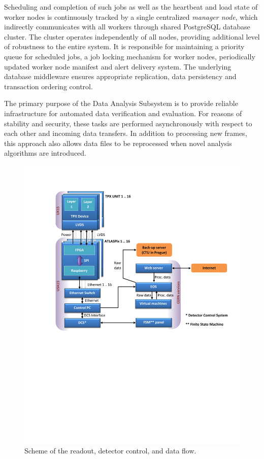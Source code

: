 \documentclass[conference]{IEEEtran}
\begin{document}
Scheduling and completion of such jobs as well as the heartbeat and load state of worker nodes is continuously tracked by a single centralized \textit{manager node}, which indirectly communicates with all workers through shared PostgreSQL database cluster. The cluster operates independently of all nodes, providing additional level of robustness to the entire system. It is responsible for maintaining a priority queue for scheduled jobs, a job locking mechanism for worker nodes, periodically updated worker node manifest and alert delivery system. The underlying database middleware ensures appropriate replication, data persistency and transaction ordering control.

The primary purpose of the Data Analysis Subsystem is to provide reliable infrastructure for automated data verification and evaluation. For reasons of stability and security, these tasks are performed asynchronously with respect to each other and incoming data transfers. In addition to processing new frames, this approach also allows data files to be reprocessed when novel analysis algorithms are introduced.

\begin{figure}[tbp]
	\centering
        \includegraphics[clip, trim={2cm 11.2cm 0cm 2.6cm}, width=.5\textwidth, angle = 0 ]{Plots/Doc1.pdf}
      \caption {Scheme of the readout, detector control, and data flow.}
    \label{fig:data_flow}
\end{figure}
\end{document}
